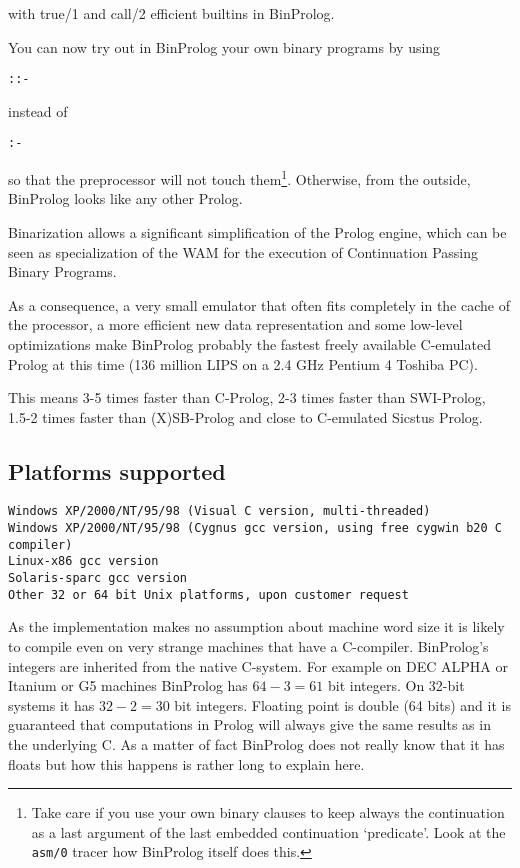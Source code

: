 \documentclass{article}
\begin{document}
{\flushleft with} true/1 and call/2 efficient builtins in BinProlog.

You can now try out in BinProlog  your own binary programs by using
\begin{verbatim}
::-
\end{verbatim}
instead of
\begin{verbatim}
:- 
\end{verbatim}
so that the preprocessor will not touch
them\footnote{Take care if you use your own binary clauses to keep always
the continuation as a last argument of the last embedded continuation `predicate'. Look at the {\tt asm/0} tracer how
BinProlog itself does this.}. Otherwise, from the outside, BinProlog
looks like any other Prolog.

Binarization allows a significant simplification of the Prolog engine,
which can be seen as specialization of the WAM for the execution of
Continuation Passing Binary Programs.

As a consequence, a very small emulator that often
fits completely in the cache of the processor, a more efficient new
data representation and some low-level optimizations make BinProlog
probably the fastest freely available C-emulated Prolog at this time
(136 million LIPS on a 2.4 GHz Pentium 4 Toshiba PC).

This means 3-5 times faster than C-Prolog, 2-3 times faster than
SWI-Prolog, 1.5-2 times faster than (X)SB-Prolog and close to C-emulated
Sicstus Prolog.

\subsection{Platforms supported}

\begin{verbatim}
Windows XP/2000/NT/95/98 (Visual C version, multi-threaded)
Windows XP/2000/NT/95/98 (Cygnus gcc version, using free cygwin b20 C compiler)
Linux-x86 gcc version
Solaris-sparc gcc version
Other 32 or 64 bit Unix platforms, upon customer request
\end{verbatim}

{\flushleft As}
 the implementation makes no assumption about machine word size it is
likely to compile even on very strange machines that have a C-compiler.
BinProlog's integers are inherited from the native C-system.
For example on DEC ALPHA or Itanium or G5 machines BinProlog has $64-3=61$ bit integers.
On 32-bit systems it has $32-2=30$ bit integers.
Floating point is double (64 bits) and it is guaranteed that computations
in Prolog will always give the same results as in the underlying C.
As a matter of fact BinProlog does not really know that it has floats
but how this happens is rather long to explain here.
\end{document}
